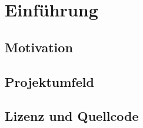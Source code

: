 \chapter{Einführung}
\label{cha:Einleitung}


\section{Motivation}
\label{sec:Motivation}

\section{Projektumfeld}
\label{sec:Projektumfeld}

\section{Lizenz und Quellcode}
\label{sec:licens_code}
